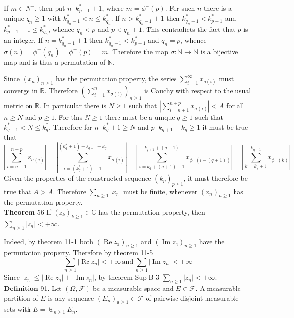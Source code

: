\documentclass[a4paper]{article}
\newcommand{\brac}[1]{\left ( #1 \right )}
\newcommand{\abs}[1]{\left | #1 \right |}
\newcommand{\Real}{\mathbb{R}}
\newcommand{\Cplx}{\mathbb{C}}
\newcommand{\Fcal}{\mathcal{F}}
\newcommand{\defn}{\mathop{\overset{\Delta}{=}}\nolimits}
\newcommand{\re}{\operatorname{Re}\nolimits}
\newcommand{\im}{\operatorname{Im}\nolimits}
\begin{document}
If $m\in N^-$, then put $n\defn k^*_{p-1}+1$, where $m=\phi^-\brac{p}$. For such $n$ there is a unique $q_n\geq 1$ with $k^*_{q_n-1}<n\leq k^*_{q_n}$. If $n>k^*_{q_n-1}+1$ then $k^*_{q_n-1}<k^*_{p-1}$ and $k^*_{p-1}+1\leq k^*_{q_n}$, whence $q_n<p$ and $p<q_n+1$. This contradicts the fact that $p$ is an integer. If $n=k^*_{q_n-1}+1$ then $k^*_{q_n-1}<k^*_{p-1}$ and $q_n=p$, whence $\sigma\brac{n}=\phi^-\brac{q_n}=\phi^-\brac{p}=m$. Therefore the map $\sigma:\mathbb{N}\to\mathbb{N}$ is a bijective map and is thus a permutation of $\mathbb{N}$.

Since $\brac{x_n}_{n\geq1}$ has the permutation property, the series $\sum_{i=1}^\infty x_{\sigma\brac{i}}$ must converge in $\Real$. Therefore $\brac{\sum_{i=1}^n x_{\sigma\brac{i}}}_{n\geq1}$ is Cauchy with respect to the usual metric on $\Real$. In particular there is $N\geq 1$ such that $\abs{\sum_{i=n+1}^{n+p} x_{\sigma\brac{i}}} < A$ for all $n\geq N$ and $p\geq 1$. For this $N\geq 1$ there must be a unique $q\geq 1$ such that $k^*_{q-1}<N\leq k^*_q$. Therefore for $n\defn k^*_q+1\geq N$ and $p\defn k_{q+1}-k_q\geq 1$ it must be true that \[\abs{\sum_{i=n+1}^{n+p} x_{\sigma\brac{i}}} = \abs{\sum_{i=\brac{k^*_q+1}+1}^{\brac{k^*_q+1}+k_{q+1}-k_q} x_{\sigma\brac{i}}} = \abs{\sum_{i=k_q+\brac{q+1}+1}^{k_{q+1}+\brac{q+1}} x_{\phi^+\brac{i-\brac{q+1}}}} = \abs{\sum_{k=k_q+1}^{k_{q+1}} x_{\phi^+\brac{k}}}\] Given the properties of the constructed sequence $\brac{k_p}_{p\geq 1}$, it must therefore be true that $A>A$. Therefore $\sum_{n\geq 1} \abs{x_n}$ must be finite, whenever $\brac{x_n}_{n\geq 1}$ has the permutation property.\\

\label{thm:absolute_summation} \noindent \textbf{Theorem} 56
If $\brac{z_k}_{k\geq1}\in \Cplx$ has the permutation property, then $\sum_{n\geq 1} \abs{z_n} < +\infty$.

Indeed, by theorem 11-1 both $\brac{\re z_n}_{n\geq1}$ and $\brac{\im z_n}_{n\geq1}$ have the permutation property. Therefore by theorem 11-5 \[\sum_{n\geq1} \abs{\re z_n}<+\infty\,\text{and}\,\sum_{n\geq1} \abs{\im z_n}<+\infty\] Since $\abs{z_n}\leq \abs{\re z_n}+\abs{\im z_n}$, by theorem Sup-B-3 $\sum_{n\geq 1} \abs{z_n} < +\infty$.\\

\noindent \textbf{Definition} 91.
Let $\brac{\Omega, \Fcal}$ be a measurable space and $E\in \Fcal$. A measurable partition of $E$ is any sequence $\brac{E_n}_{n\geq 1}\in \Fcal$ of pairwise disjoint measurable sets with $E=\uplus_{n\geq 1} E_n$.
\end{document}
